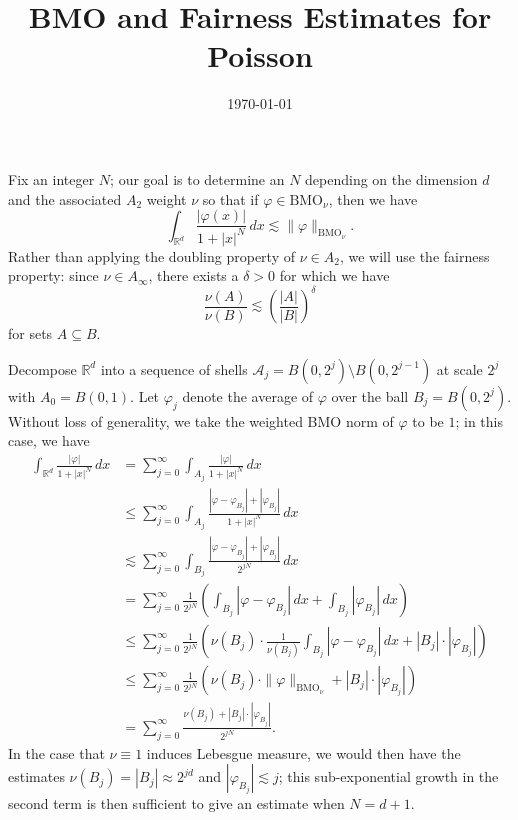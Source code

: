 \documentclass{amsart}
\title{BMO and Fairness Estimates for Poisson}
\date{\today}
\begin{document}
\maketitle
Fix an integer $N$; our goal is to determine an $N$ depending on the dimension $d$ and the associated $A_2$ weight $\nu$ so that if $\varphi \in \text{BMO}_{\nu}$, then we have
$$\int_{\mathbb{R}^d} \frac{|\varphi(x)|}{1 + |x|^N} \, dx \lesssim \|\varphi\|_{\text{BMO}_{\nu}}.$$
Rather than applying the doubling property of $\nu \in A_2$, we will use the fairness property: since $\nu \in A_{\infty}$, there exists a $\delta > 0$ for which we have
$$\frac{\nu(A)}{\nu(B)} \lesssim \left(\frac{|A|}{|B|}\right)^{\delta}$$
for sets $A \subseteq B$.

Decompose $\mathbb{R}^d$ into a sequence of shells $\mathcal{A}_j = B(0, 2^j) \setminus B(0, 2^{j - 1})$ at scale $2^j$ with $A_0 = B(0, 1)$. Let $\varphi_j$ denote the average of $\varphi$ over the ball $B_j = B(0, 2^j)$. Without loss of generality, we take the weighted BMO norm of $\varphi$ to be $1$; in this case, we have
\begin{align*}
	\int_{\mathbb{R}^d} \frac{|\varphi|}{1 + |x|^N} \, dx &= \sum_{j = 0}^{\infty} \int_{A_j} \frac{|\varphi|}{1 + |x|^N} \, dx \\
	&\le \sum_{j = 0}^{\infty} \int_{A_j} \frac{|\varphi - \varphi_{B_j}| + |\varphi_{B_j}|}{1 + |x|^N} \, dx \\
	&\lesssim \sum_{j = 0}^{\infty} \int_{B_j} \frac{|\varphi - \varphi_{B_j}| + |\varphi_{B_j}|}{2^{jN}} \, dx \\
	&= \sum_{j = 0}^{\infty} \frac{1}{2^{jN}} \left(\int_{B_j} |\varphi - \varphi_{B_j}| \, dx + \int_{B_j} |\varphi_{B_j}| \, dx\right) \\
	&\le \sum_{j = 0}^{\infty} \frac{1}{2^{jN}} \left(\nu(B_j) \cdot \frac{1}{\nu(B_j)} \int_{B_j} |\varphi - \varphi_{B_j}| \, dx + |B_j| \cdot |\varphi_{B_j}|\right) \\
	&\le \sum_{j = 0}^{\infty} \frac{1}{2^{jN}} \left(\nu(B_j) \cdot \|\varphi\|_{\text{BMO}_{\nu}} + |B_j| \cdot |\varphi_{B_j}|\right) \\
	&= \sum_{j = 0}^{\infty} \frac{\nu(B_j) + |B_j| \cdot |\varphi_{B_j}|}{2^{jN}}.
\end{align*}
In the case that $\nu \equiv 1$ induces Lebesgue measure, we would then have the estimates $\nu(B_j) = |B_j| \approx 2^{jd}$ and $|\varphi_{B_j}| \lesssim j$; this sub-exponential growth in the second term is then sufficient to give an estimate when $N = d + 1$.
\end{document}
